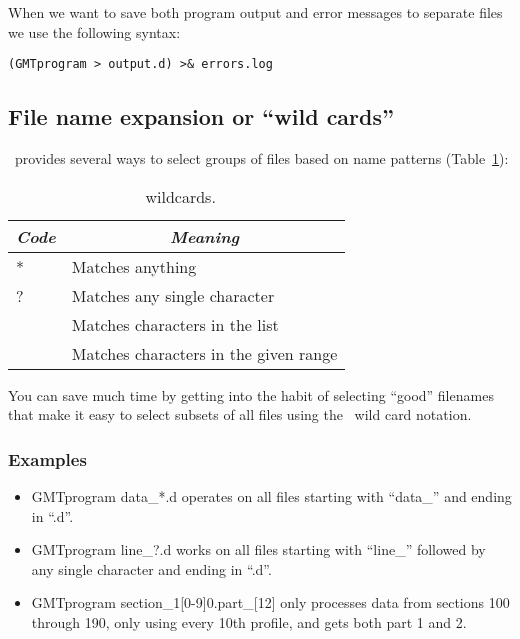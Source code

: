 \documentclass{report}
\begin{document}
When we want to save both program output and error messages to
separate files we use the following syntax:

\begin{verbatim}
(GMTprogram > output.d) >& errors.log
\end{verbatim}

\subsection{File name expansion or ``wild cards''}

\UNIX\ provides several ways to select groups of files based
on name patterns (Table~\ref{tbl:wildcard}):

\begin{table}[h]
\small
\centering
\begin{tabular}{|l|l|} \hline
\multicolumn{1}{|c|}{\emph{Code}} & \multicolumn{1}{c|}{\emph{Meaning}} \\ \hline
*       &       Matches anything \\ \hline
?       &       Matches any single character \\ \hline
[\emph{list}]   &       Matches characters in the list \\ \hline
[\emph{range}]  &       Matches characters in the given range \\ \hline
\end{tabular}
\caption{\UNIX\ wildcards.} \label{tbl:wildcard}
\end{table}
 
\noindent
You can save much time by getting into the habit of selecting
``good'' filenames that make it easy to select subsets of all
files using the \UNIX\ wild card notation.

\subsubsection{Examples}

\begin{itemize}
\item GMTprogram data\_*.d operates on all files starting with
``data\_'' and ending in ``.d''.

\item GMTprogram line\_?.d works on all files starting with
``line\_'' followed by any single character and ending in ``.d''.

\item GMTprogram section\_1[0-9]0.part\_[12] only processes data
from sections 100 through 190, only using every 10th profile, and
gets both part 1 and 2.

\end{itemize} 
\end{document}
